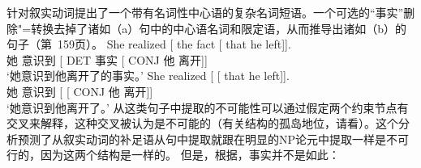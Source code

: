 \noindent
\citet{KK70a}针对叙实动词提出了一个带有名词性中心语的复杂名词短语。一个可选的“事实”删除"=转换去掉了诸如（a）句中的中心语名词和限定语，从而推导出诸如（b）的句子（第~159页）。
\eal
\ex 
\gll She realized [ the fact [ that he left]].\\
她 意识到 [ DET 事实 [ CONJ 他 离开]]\\
\glt `她意识到他离开了的事实。'
\ex 
\gll She realized [ [ that he left]].\\
她 意识到 [ [ CONJ 他 离开]]\\
\glt `她意识到他离开了。'
\zl
\addlines
从这类句子中提取的不可能性可以通过假定两个约束节点有交叉来解释，这种交叉被认为是不可能的（有关结构的孤岛地位，请看\citealp[Section~4]{KK70a}）。这个分析预测了从叙实动词的补足语从句中提取就跟在明显的NP论元中提取一样是不可行的，因为这两个结构是一样的。
但是，根据\citet[]{AG2008a}，事实并不是如此：
\eal
{}
\zl

